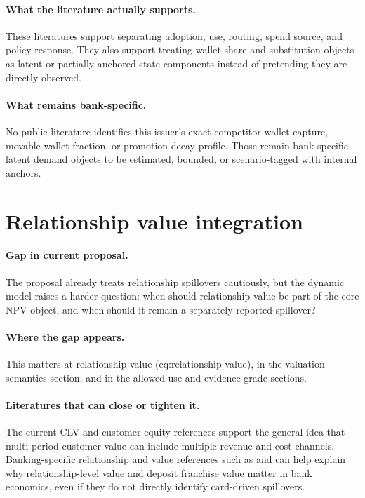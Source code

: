 \documentclass[11pt]{article}
\begin{document}
\paragraph{What the literature actually supports.}
These literatures support separating adoption, use, routing, spend source, and
policy response. They also support treating wallet-share and substitution objects
as latent or partially anchored state components instead of pretending they are
directly observed.

\paragraph{What remains bank-specific.}
No public literature identifies this issuer's exact competitor-wallet capture,
movable-wallet fraction, or promotion-decay profile. Those remain bank-specific
latent demand objects to be estimated, bounded, or scenario-tagged with internal
anchors.

\section{Relationship value integration}

\paragraph{Gap in current proposal.}
The proposal already treats relationship spillovers cautiously, but the dynamic
model raises a harder question: when should relationship value be part of the
core NPV object, and when should it remain a separately reported spillover?

\paragraph{Where the gap appears.}
This matters at relationship value (eq:relationship-value), in the
valuation-semantics section, and in the allowed-use and evidence-grade
sections.

\paragraph{Literatures that can close or tighten it.}
The current CLV and customer-equity references
\citep{berger1998clv,rust2004return,venkatesan2004clv,bolton1998duration}
support the general idea that multi-period customer value can include multiple
revenue and cost channels. Banking-specific relationship and value references
such as \citet{lewis2005relationshippricing} and \citet{egan2022bankvalue} can
help explain why relationship-level value and deposit franchise value matter in
bank economics, even if they do not directly identify card-driven spillovers.
\end{document}
